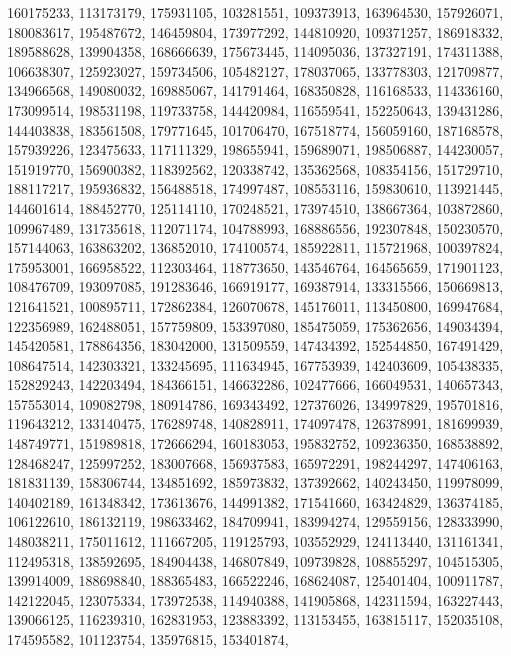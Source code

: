 {{    160175233, 113173179, 175931105, 103281551, 109373913, 163964530,
    157926071, 180083617, 195487672, 146459804, 173977292, 144810920,
    109371257, 186918332, 189588628, 139904358, 168666639, 175673445,
    114095036, 137327191, 174311388, 106638307, 125923027, 159734506,
    105482127, 178037065, 133778303, 121709877, 134966568, 149080032,
    169885067, 141791464, 168350828, 116168533, 114336160, 173099514,
    198531198, 119733758, 144420984, 116559541, 152250643, 139431286,
    144403838, 183561508, 179771645, 101706470, 167518774, 156059160,
    187168578, 157939226, 123475633, 117111329, 198655941, 159689071,
    198506887, 144230057, 151919770, 156900382, 118392562, 120338742,
    135362568, 108354156, 151729710, 188117217, 195936832, 156488518,
    174997487, 108553116, 159830610, 113921445, 144601614, 188452770,
    125114110, 170248521, 173974510, 138667364, 103872860, 109967489,
    131735618, 112071174, 104788993, 168886556, 192307848, 150230570,
    157144063, 163863202, 136852010, 174100574, 185922811, 115721968,
    100397824, 175953001, 166958522, 112303464, 118773650, 143546764,
    164565659, 171901123, 108476709, 193097085, 191283646, 166919177,
    169387914, 133315566, 150669813, 121641521, 100895711, 172862384,
    126070678, 145176011, 113450800, 169947684, 122356989, 162488051,
    157759809, 153397080, 185475059, 175362656, 149034394, 145420581,
    178864356, 183042000, 131509559, 147434392, 152544850, 167491429,
    108647514, 142303321, 133245695, 111634945, 167753939, 142403609,
    105438335, 152829243, 142203494, 184366151, 146632286, 102477666,
    166049531, 140657343, 157553014, 109082798, 180914786, 169343492,
    127376026, 134997829, 195701816, 119643212, 133140475, 176289748,
    140828911, 174097478, 126378991, 181699939, 148749771, 151989818,
    172666294, 160183053, 195832752, 109236350, 168538892, 128468247,
    125997252, 183007668, 156937583, 165972291, 198244297, 147406163,
    181831139, 158306744, 134851692, 185973832, 137392662, 140243450,
    119978099, 140402189, 161348342, 173613676, 144991382, 171541660,
    163424829, 136374185, 106122610, 186132119, 198633462, 184709941,
    183994274, 129559156, 128333990, 148038211, 175011612, 111667205,
    119125793, 103552929, 124113440, 131161341, 112495318, 138592695,
    184904438, 146807849, 109739828, 108855297, 104515305, 139914009,
    188698840, 188365483, 166522246, 168624087, 125401404, 100911787,
    142122045, 123075334, 173972538, 114940388, 141905868, 142311594,
    163227443, 139066125, 116239310, 162831953, 123883392, 113153455,
    163815117, 152035108, 174595582, 101123754, 135976815, 153401874,
}}
